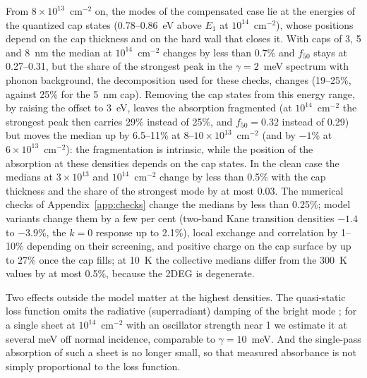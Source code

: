 \documentclass[11pt]{article}
\begin{document}
From $8\times10^{13}$~cm$^{-2}$ on, the modes of the compensated case lie at the energies of the quantized cap states (0.78--0.86~eV above $E_1$ at $10^{14}$~cm$^{-2}$), whose positions depend on the cap thickness and on the hard wall that closes it. With caps of 3, 5 and 8~nm the median at $10^{14}$~cm$^{-2}$ changes by less than 0.7\% and $f_{50}$ stays at 0.27--0.31, but the share of the strongest peak in the $\gamma=2$~meV spectrum with phonon background, the decomposition used for these checks, changes (19--25\%, against 25\% for the 5~nm cap). Removing the cap states from this energy range, by raising the offset to 3~eV, leaves the absorption fragmented (at $10^{14}$~cm$^{-2}$ the strongest peak then carries 29\% instead of 25\%, and $f_{50}=0.32$ instead of 0.29) but moves the median up by 6.5--11\% at 8--$10\times10^{13}$~cm$^{-2}$ (and by $-1$\% at $6\times10^{13}$~cm$^{-2}$): the fragmentation is intrinsic, while the position of the absorption at these densities depends on the cap states. In the clean case the medians at $3\times10^{13}$ and $10^{14}$~cm$^{-2}$ change by less than 0.5\% with the cap thickness and the share of the strongest mode by at most 0.03. The numerical checks of Appendix~\ref{app:checks} change the medians by less than 0.25\%; model variants change them by a few per cent (two-band Kane transition densities $-1.4$ to $-3.9$\%, the $k=0$ response up to 2.1\%), local exchange and correlation by 1--10\% depending on their screening, and positive charge on the cap surface by up to 27\% once the cap fills; at 10~K the collective medians differ from the 300~K values by at most 0.5\%, because the 2DEG is degenerate.

Two effects outside the model matter at the highest densities. The quasi-static loss function omits the radiative (superradiant) damping of the bright mode \cite{Vasanelli2020}; for a single sheet at $10^{14}$~cm$^{-2}$ with an oscillator strength near 1 we estimate it at several meV off normal incidence, comparable to $\gamma=10$~meV. And the single-pass absorption of such a sheet is no longer small, so that measured absorbance is not simply proportional to the loss function.
\end{document}
